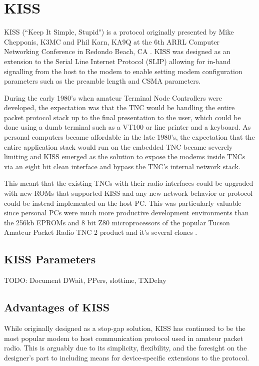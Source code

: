 \chapter{KISS}

KISS (``Keep It Simple, Stupid") is a protocol originally presented by 
Mike Chepponis, K3MC and Phil Karn, KA9Q at the 6th ARRL Computer Networking
Conference in Redondo Beach, CA \cite{KISSspec}.
KISS was designed as an extension to the Serial Line 
Internet Protocol (SLIP) allowing for in-band signalling from 
the host to the modem to enable setting modem 
configuration parameters such as the preamble length and CSMA parameters.

During the early 1980's when amateur Terminal Node Controllers were developed,
the expectation was that the TNC would be handling 
the entire packet protocol stack up to the final presentation to the user, which
could be done using a dumb terminal such as a VT100 or line printer 
and a keyboard. 
As personal computers became affordable in the late 1980's, the expectation that
the entire application stack would run on the embedded TNC became severely limiting
and KISS emerged as the solution to expose the modems inside TNCs via 
an eight bit clean interface and bypass the TNC's internal network stack.

This meant that the existing TNCs with their radio interfaces could
be upgraded with new ROMs that supported KISS and any new network behavior
or protocol could be instead implemented on the host PC.
This was particularly valuable since personal PCs were much
more productive development environments than the 256kb EPROMs and 8 bit
Z80 microprocessors of the popular Tucson Amateur Packet Radio TNC 2 product
and it's several clones \cite{TNC2manual}.

\section{KISS Parameters}
\label{sec:kissparm}

TODO: Document DWait, PPers, slottime, TXDelay

\section{Advantages of KISS}

While originally designed as a stop-gap solution, KISS has continued to be 
the most popular modem to host communication protocol used in amateur packet radio.
This is arguably due to its simplicity, flexibility,
and the foresight on the designer's part
to including means for device-specific extensions to the protocol.

